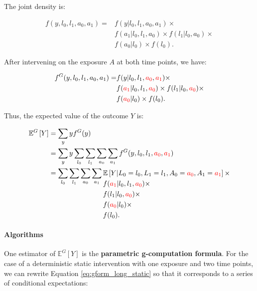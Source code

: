 \documentclass[12pt,twoside]{article}
\begin{document}
The joint density is:

\begin{align}
    f(y,l_0,l_1,a_0,a_1) = &f(y|l_0,l_1,a_0,a_1)\times\\
    &f(a_1|l_0,l_1,a_0) \times f(l_1|l_0,a_0)\times\\
    &f(a_0|l_0) \times f(l_0).
\end{align}

After intervening on the exposure $A$ at both time points, we have:

\begin{align}
    f^G(y,l_0,l_1,a_0,a_1) = &f(y|l_0,l_1,\textcolor{red}{a_0},\textcolor{red}{a_1})\times\\
    &f(\textcolor{red}{a_1}|l_0,l_1,\textcolor{red}{a_0}) \times f(l_1|l_0,\textcolor{red}{a_0})\times\\
    &f(\textcolor{red}{a_0}|l_0) \times f(l_0).
\end{align}

Thus, the expected value of the outcome $Y$ is:

\begin{align}
    \mathbb{E}^G \left[ Y \right] &= \sum_y y f^G(y) \\
    &= \sum_y y \sum_{l_0} \sum_{l_1} \sum_{a_0} \sum_{a_1} f^G(y,l_0,l_1,\textcolor{red}{a_0},\textcolor{red}{a_1}) \\
    &= \sum_{l_0} \sum_{l_1} \sum_{a_0} \sum_{a_1}
    \!\begin{aligned}[t] \label{eq:gform_long_static}
        &\mathbb{E} \left[ Y|L_0=l_0,L_1=l_1,A_0=\textcolor{red}{a_0},A_1=\textcolor{red}{a_1} \right]\times\\
        &f(\textcolor{red}{a_1}|l_0,l_1,\textcolor{red}{a_0})\times\\
        &f(l_1|l_0,\textcolor{red}{a_0})\times\\
        &f(\textcolor{red}{a_0}|l_0)\times\\
        &f(l_0).
    \end{aligned}
\end{align}

\paragraph*{Algorithms}
One estimator of $\mathbb{E}^G [Y]$ is the \textbf{parametric g-computation formula}. For the case of a deterministic static intervention with one exposure and two time points, we can rewrite Equation \ref{eq:gform_long_static} so that it corresponds to a series of conditional expectations:
\end{document}
